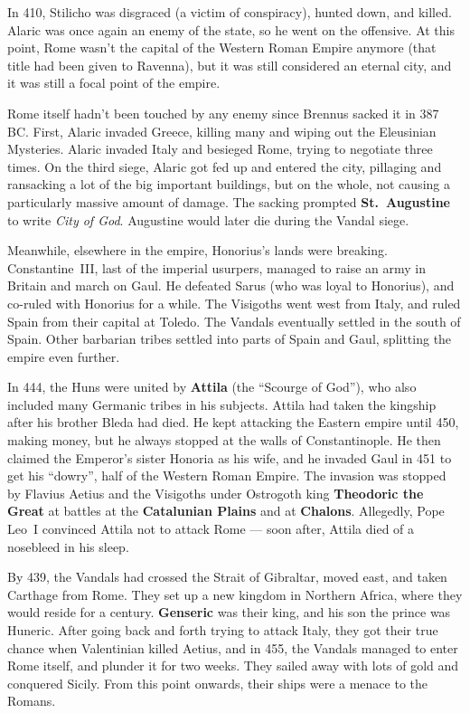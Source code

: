 In 410, Stilicho was disgraced (a victim of conspiracy), hunted down, and killed.
Alaric was once again an enemy of the state, so he went on the offensive.
At this point, Rome wasn't the capital of the Western Roman Empire anymore
(that title had been given to Ravenna),
but it was still considered an eternal city, and it was still a focal point of the empire.

Rome itself hadn't been touched by any enemy since Brennus sacked it in 387 BC\@.
First, Alaric invaded Greece, killing many and wiping out the Eleusinian Mysteries.
Alaric invaded Italy and besieged Rome, trying to negotiate three times.
On the third siege, Alaric got fed up and entered the city,
pillaging and ransacking a lot of the big important buildings,
but on the whole, not causing a particularly massive amount of damage.
The sacking prompted \textbf{St.\ Augustine} to write \textit{City of God}.
Augustine would later die during the Vandal siege.

Meanwhile, elsewhere in the empire, Honorius's lands were breaking.
Constantine~III, last of the imperial usurpers,
managed to raise an army in Britain and march on Gaul.
He defeated Sarus (who was loyal to Honorius), and co-ruled with Honorius for a while.
The Visigoths went west from Italy, and ruled Spain from their capital at Toledo.
The Vandals eventually settled in the south of Spain.
Other barbarian tribes settled into parts of Spain and Gaul, splitting the empire even further.

In 444, the Huns were united by \textbf{Attila} (the ``Scourge of God''),
who also included many Germanic tribes in his subjects.
Attila had taken the kingship after his brother Bleda had died.
He kept attacking the Eastern empire until 450, making money,
but he always stopped at the walls of Constantinople.
He then claimed the Emperor's sister Honoria as his wife,
and he invaded Gaul in 451 to get his ``dowry'', half of the Western Roman Empire.
The invasion was stopped by Flavius Aetius and the Visigoths
under Ostrogoth king \textbf{Theodoric the Great}
at battles at the \textbf{Catalunian Plains} and at \textbf{Chalons}.
Allegedly, Pope Leo~I convinced Attila not to attack Rome ---
soon after, Attila died of a nosebleed in his sleep.

By 439, the Vandals had crossed the Strait of Gibraltar, moved east, and taken Carthage from Rome.
They set up a new kingdom in Northern Africa, where they would reside for a century.
\textbf{Genseric} was their king, and his son the prince was Huneric.
After going back and forth trying to attack Italy,
they got their true chance when Valentinian killed Aetius,
and in 455, the Vandals managed to enter Rome itself, and plunder it for two weeks.
They sailed away with lots of gold and conquered Sicily.
From this point onwards, their ships were a menace to the Romans.

